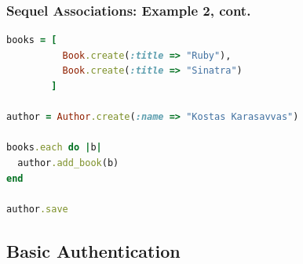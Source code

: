 \documentclass{beamer}
\begin{document}
\begin{frame}[fragile]\frametitle{Sequel Associations: Example 2, cont.} 

  \begin{lstlisting}[language=ruby, escapechar={^}]
books = [
          Book.create(:title => "Ruby"),
          Book.create(:title => "Sinatra")
        ]
        
author = Author.create(:name => "Kostas Karasavvas")
  
books.each do |b| 
  author.add_book(b) 
end
  
author.save
  \end{lstlisting}

\end{frame}



\subsection{Basic Authentication} 
\end{document}
